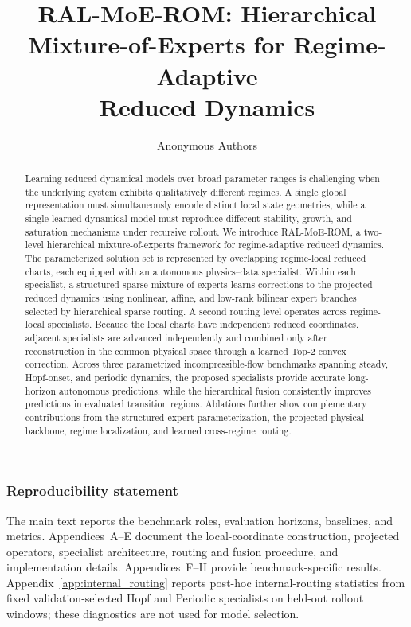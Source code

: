 \documentclass{article}
\title{RAL-MoE-ROM: Hierarchical\\
Mixture-of-Experts for Regime-Adaptive\\
Reduced Dynamics}
\author{Anonymous Authors}
\begin{document}
\maketitle

\begin{abstract}
Learning reduced dynamical models over broad parameter ranges is challenging when the underlying system exhibits qualitatively different regimes. A single global representation must simultaneously encode distinct local state geometries, while a single learned dynamical model must reproduce different stability, growth, and saturation mechanisms under recursive rollout. We introduce RAL-MoE-ROM, a two-level hierarchical mixture-of-experts framework for regime-adaptive reduced dynamics. The parameterized solution set is represented by overlapping regime-local reduced charts, each equipped with an autonomous physics--data specialist. Within each specialist, a structured sparse mixture of experts learns corrections to the projected reduced dynamics using nonlinear, affine, and low-rank bilinear expert branches selected by hierarchical sparse routing. A second routing level operates across regime-local specialists. Because the local charts have independent reduced coordinates, adjacent specialists are advanced independently and combined only after reconstruction in the common physical space through a learned Top-2 convex correction. Across three parametrized incompressible-flow benchmarks spanning steady, Hopf-onset, and periodic dynamics, the proposed specialists provide accurate long-horizon autonomous predictions, while the hierarchical fusion consistently improves predictions in evaluated transition regions. Ablations further show complementary contributions from the structured expert parameterization, the projected physical backbone, regime localization, and learned cross-regime routing.
\end{abstract}





\FloatBarrier



\subsubsection*{Reproducibility statement}
The main text reports the benchmark roles, evaluation horizons, baselines, and metrics. Appendices~A--E document the local-coordinate construction, projected operators, specialist architecture, routing and fusion procedure, and implementation details. Appendices~F--H provide benchmark-specific results.
Appendix~\ref{app:internal_routing} reports post-hoc internal-routing statistics
from fixed validation-selected Hopf and Periodic specialists on held-out
rollout windows; these diagnostics are not used for model selection.
\end{document}
